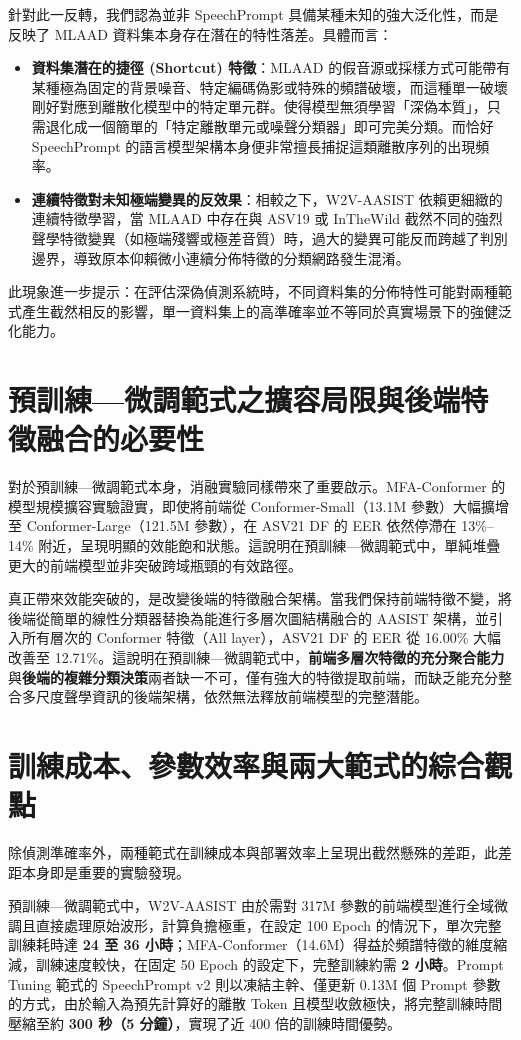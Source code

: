 針對此一反轉，我們認為並非 SpeechPrompt 具備某種未知的強大泛化性，而是反映了 MLAAD 資料集本身存在潛在的特性落差。具體而言：
\begin{itemize}
    \item \textbf{資料集潛在的捷徑 (Shortcut) 特徵}：MLAAD 的假音源或採樣方式可能帶有某種極為固定的背景噪音、特定編碼偽影或特殊的頻譜破壞，而這種單一破壞剛好對應到離散化模型中的特定單元群。使得模型無須學習「深偽本質」，只需退化成一個簡單的「特定離散單元或噪聲分類器」即可完美分類。而恰好 SpeechPrompt 的語言模型架構本身便非常擅長捕捉這類離散序列的出現頻率。
    \item \textbf{連續特徵對未知極端變異的反效果}：相較之下，W2V-AASIST 依賴更細緻的連續特徵學習，當 MLAAD 中存在與 ASV19 或 InTheWild 截然不同的強烈聲學特徵變異（如極端殘響或極差音質）時，過大的變異可能反而跨越了判別邊界，導致原本仰賴微小連續分佈特徵的分類網路發生混淆。
\end{itemize}
此現象進一步提示：在評估深偽偵測系統時，不同資料集的分佈特性可能對兩種範式產生截然相反的影響，單一資料集上的高準確率並不等同於真實場景下的強健泛化能力。

\section{預訓練—微調範式之擴容局限與後端特徵融合的必要性}
\label{sec:concl_backend}
對於預訓練—微調範式本身，消融實驗同樣帶來了重要啟示。MFA-Conformer 的模型規模擴容實驗證實，即使將前端從 Conformer-Small（13.1M 參數）大幅擴增至 Conformer-Large（121.5M 參數），在 ASV21 DF 的 EER 依然停滯在 13\%--14\% 附近，呈現明顯的效能飽和狀態。這說明在預訓練—微調範式中，單純堆疊更大的前端模型並非突破跨域瓶頸的有效路徑。

真正帶來效能突破的，是改變後端的特徵融合架構。當我們保持前端特徵不變，將後端從簡單的線性分類器替換為能進行多層次圖結構融合的 AASIST 架構，並引入所有層次的 Conformer 特徵（All layer），ASV21 DF 的 EER 從 16.00\% 大幅改善至 12.71\%。這說明在預訓練—微調範式中，\textbf{前端多層次特徵的充分聚合能力}與\textbf{後端的複雜分類決策}兩者缺一不可，僅有強大的特徵提取前端，而缺乏能充分整合多尺度聲學資訊的後端架構，依然無法釋放前端模型的完整潛能。

\section{訓練成本、參數效率與兩大範式的綜合觀點}
\label{sec:concl_cost}
除偵測準確率外，兩種範式在訓練成本與部署效率上呈現出截然懸殊的差距，此差距本身即是重要的實驗發現。

預訓練—微調範式中，W2V-AASIST 由於需對 317M 參數的前端模型進行全域微調且直接處理原始波形，計算負擔極重，在設定 100 Epoch 的情況下，單次完整訓練耗時達 \textbf{24 至 36 小時}；MFA-Conformer（14.6M）得益於頻譜特徵的維度縮減，訓練速度較快，在固定 50 Epoch 的設定下，完整訓練約需 \textbf{2 小時}。Prompt Tuning 範式的 SpeechPrompt v2 則以凍結主幹、僅更新 0.13M 個 Prompt 參數的方式，由於輸入為預先計算好的離散 Token 且模型收斂極快，將完整訓練時間壓縮至約 \textbf{300 秒（5 分鐘）}，實現了近 400 倍的訓練時間優勢。

